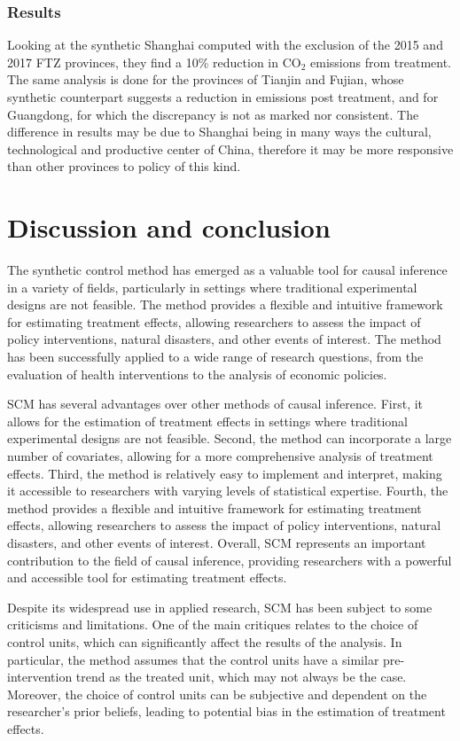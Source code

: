 \documentclass[12pt,a4paper,draft]{article}
\begin{document}
\subsubsection{Results}
Looking at the synthetic Shanghai computed with the exclusion of the 2015 and 2017 
FTZ provinces, they find a 10\% reduction in CO$_2$ emissions from treatment. 
The same analysis is done for the provinces of Tianjin and Fujian, whose synthetic 
counterpart suggests a reduction in emissions post treatment, and for Guangdong, 
for which the discrepancy is not as marked nor consistent. 
The difference in results may be due to Shanghai being in many ways the cultural, 
technological and productive center of China, therefore it may be more responsive 
than other provinces to policy of this kind. 



\section{Discussion and conclusion} %
The synthetic control method has emerged as a valuable tool for causal inference 
in a variety of fields, particularly in settings where traditional experimental 
designs are not feasible. The method provides a flexible and intuitive 
framework for estimating treatment effects, allowing researchers to assess the 
impact of policy interventions, natural disasters, and other events of interest. 
The method has been successfully applied to a wide range of research questions, 
from the evaluation of health interventions to the analysis of economic policies.

SCM has several advantages over other methods of causal inference. 
First, it allows for the estimation of treatment effects in settings where 
traditional experimental designs are not feasible. 
Second, the method can incorporate a large number of covariates, allowing for 
a more comprehensive analysis of treatment effects. 
Third, the method is relatively easy to implement and interpret, making it 
accessible to researchers with varying levels of statistical expertise. 
Fourth, the method provides a flexible and intuitive framework for estimating 
treatment effects, allowing researchers to assess the impact of policy interventions, 
natural disasters, and other events of interest. 
Overall, SCM represents an important contribution to the field of causal inference, 
providing researchers with a powerful and accessible tool for estimating treatment 
effects.

Despite its widespread use in applied research, SCM has 
been subject to some criticisms and limitations. 
One of the main critiques relates to the choice of control units, which can 
significantly affect the results of the analysis. 
In particular, the method assumes that the control units have a similar 
pre-intervention trend as the treated unit, which may not always be the case. 
Moreover, the choice of control units can be subjective and dependent on the 
researcher's prior beliefs, leading to potential bias in the estimation of treatment 
effects.
\end{document}
